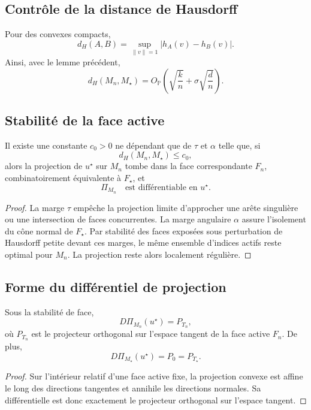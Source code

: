 \subsection{Contrôle de la distance de Hausdorff}

Pour des convexes compacts,
\[
d_H(A,B)=\sup_{\|v\|=1}|h_A(v)-h_B(v)|.
\]
Ainsi, avec le lemme précédent,
\[
d_H(M_n,M_\star)
=
O_{\mathbb P}\!\left(
\sqrt{\frac{k}{n}}
+
\sigma\sqrt{\frac{d}{n}}
\right).
\]

\subsection{Stabilité de la face active}

\begin{lemma}
Il existe une constante \(c_0>0\) ne dépendant que de \(\tau\) et \(\alpha\) telle que, si
\[
d_H(M_n,M_\star)\le c_0,
\]
alors la projection de \(u^\star\) sur \(M_n\) tombe dans la face correspondante \(F_n\), combinatoirement équivalente à \(F_\star\), et
\[
\Pi_{M_n}
\quad\text{est différentiable en }u^\star.
\]
\end{lemma}

\begin{proof}
La marge \(\tau\) empêche la projection limite d'approcher une arête singulière ou une intersection de faces concurrentes. La marge angulaire \(\alpha\) assure l'isolement du cône normal de \(F_\star\). Par stabilité des faces exposées sous perturbation de Hausdorff petite devant ces marges, le même ensemble d'indices actifs reste optimal pour \(M_n\). La projection reste alors localement régulière.
\end{proof}

\subsection{Forme du différentiel de projection}

\begin{proposition}
Sous la stabilité de face,
\[
D\Pi_{M_n}(u^\star)=P_{T_n},
\]
où \(P_{T_n}\) est le projecteur orthogonal sur l'espace tangent de la face active \(F_n\).
De plus,
\[
D\Pi_{M_\star}(u^\star)=P_0=P_{T_\star}.
\]
\end{proposition}

\begin{proof}
Sur l'intérieur relatif d'une face active fixe, la projection convexe est affine le long des directions tangentes et annihile les directions normales. Sa différentielle est donc exactement le projecteur orthogonal sur l'espace tangent.
\end{proof}

